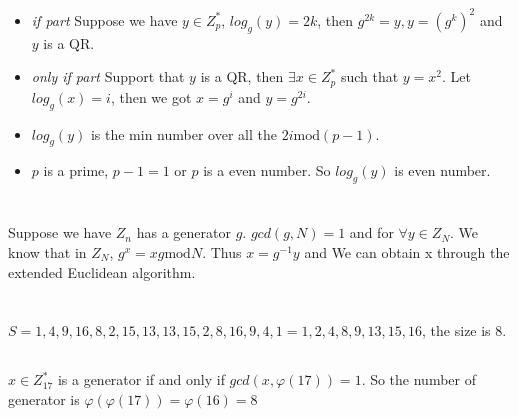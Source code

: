 \documentclass[onecolumn,oneside]{SUSTechHomework}
\begin{document}
  \subsection{}

  \begin{itemize}
    \item \emph{if part} Suppose we have $y \in Z_p^*$, $log_g(y) = 2k$, then $g^{2k} = y, y = (g^k)^2$ and $y$ is a QR. 
    \item \emph{only if part} Support that $y$ is a QR, then $\exists x \in Z_p^*$ such that $y = x^2$. Let $log_g(x) = i$, then we got $x = g^i$ and $y = g^{2i}$.
    \item $log_g(y)$ is the min number over all the $2i \mbox{mod} (p-1)$.
    \item $p$ is a prime, $p - 1 = 1$ or $p$ is a even number. So $log_g(y)$ is even number. 
  \end{itemize}

\section{}

Suppose we have $Z_n$ has a generator $g$.
$gcd(g, N) = 1$ and for $\forall y \in Z_N$.
We know that in $Z_N$, $g^x = xg \mbox{mod} N$.
Thus $x = g^{-1}y$ and We can obtain x through the extended Euclidean algorithm.

\section{}

  \subsection{}

  $S={1,4,9,16,8,2,15,13,13,15,2,8,16,9,4,1}={1,2,4,8,9,13,15,16}$, the size is 8.

  \subsection{}

  $x \in Z_{17}^*$ is a generator if and only if $gcd(x, \varphi(17))=1$. So the number of generator is $\varphi(\varphi(17))=\varphi(16)=8$

  \subsection{}
\end{document}
